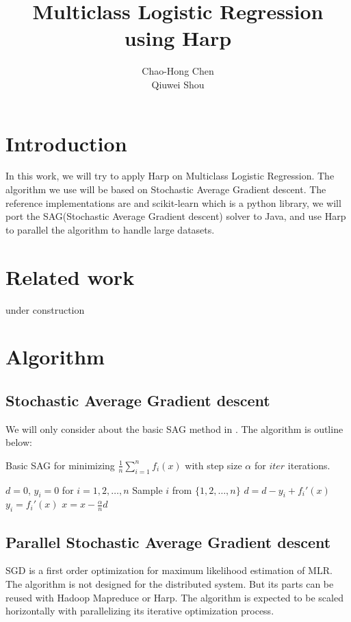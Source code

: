\documentclass[12pt]{article}
\begin{document}
\title{Multiclass Logistic Regression using Harp}
\author{Chao-Hong Chen\\Qiuwei Shou} 
\maketitle

\section{Introduction}
In this work, we will try to apply Harp\cite{harp} on Multiclass Logistic Regression.
The algorithm we use will be based on Stochastic Average Gradient descent\cite{Schmidt2016}.
The reference implementations are \cite{logistic-regression} and scikit-learn\cite{scikit-learn} which is a python library,
we will port the SAG(Stochastic Average Gradient descent) solver to Java,
and use Harp to parallel the algorithm to handle large datasets.
\section{Related work}
under construction
\section{Algorithm}
\subsection{Stochastic Average Gradient descent}
We will only consider about the basic SAG method in \cite{Schmidt2016}.
The algorithm is outline below:
\begin{algorithm}[htb]
  \caption{Basic SAG for minimizing $\frac{1}{n}\sum_{i=1}^n f_i(x)$ with step size $\alpha$ for $iter$ iterations.}
  \label{alg:sag}
  \begin{algorithmic}[1]
    \State $d = 0$, $y_i = 0$ for $i = 1,2,\ldots,n$
    \State Sample $i$ from $\{1,2,\ldots,n\}$
    \State $d = d - y_i + f_i'(x)$
    \State $y_i = f_i'(x)$
    \State $x = x - \frac{\alpha}{n}d$
    \EndFor
  \end{algorithmic}
\end{algorithm}

\subsection{Parallel Stochastic Average Gradient descent}
SGD is a first order optimization for maximum likelihood estimation of MLR. The algorithm is not designed for the distributed system. But its parts can be reused with Hadoop Mapreduce or Harp. The algorithm is expected to be scaled horizontally with parallelizing its iterative optimization process. 
\end{document}
